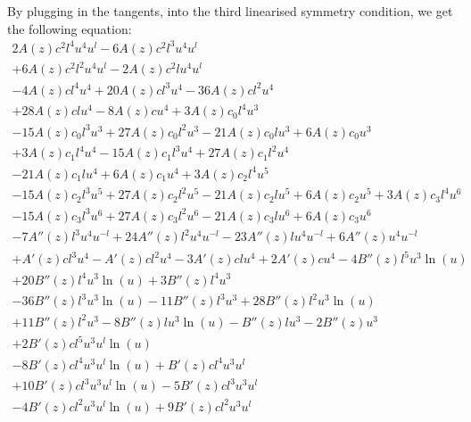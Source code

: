 By plugging in the tangents, into the third linearised symmetry condition, we get the following equation:
\begin{equation}
  \begin{split}
    2 A(z) c^{2} l^{4} u^{4} u^{l} - 6 A(z) c^{2} l^{3} u^{4} u^{l} &\\
    + 6 A(z) c^{2} l^{2} u^{4} u^{l} - 2 A(z) c^{2} l u^{4} u^{l} &\\
    - 4 A(z) c l^{4} u^{4} + 20 A(z) c l^{3} u^{4} - 36 A(z) c l^{2} u^{4}&\\
    + 28 A(z) c l u^{4} - 8 A(z) c u^{4} + 3 A(z) c_{0} l^{4} u^{3}&\\
    - 15 A(z) c_{0} l^{3} u^{3} + 27 A(z) c_{0} l^{2} u^{3} - 21 A(z) c_{0} l u^{3} + 6 A(z) c_{0} u^{3}&\\
    + 3 A(z) c_{1} l^{4} u^{4} - 15 A(z) c_{1} l^{3} u^{4} + 27 A(z) c_{1} l^{2} u^{4} &\\
    - 21 A(z) c_{1} l u^{4} + 6 A(z) c_{1} u^{4} + 3 A(z) c_{2} l^{4} u^{5} &\\
    - 15 A(z) c_{2} l^{3} u^{5} + 27 A(z) c_{2} l^{2} u^{5} - 21 A(z) c_{2} l u^{5} + 6 A(z) c_{2} u^{5} + 3 A(z) c_{3} l^{4} u^{6}&\\
    - 15 A(z) c_{3} l^{3} u^{6} + 27 A(z) c_{3} l^{2} u^{6} - 21 A(z) c_{3} l u^{6} + 6 A(z) c_{3} u^{6} &\\
    - 7 A''(z) l^{3} u^{4} u^{- l} + 24 A''(z) l^{2} u^{4} u^{- l} - 23 A''(z) l u^{4} u^{- l} + 6 A''(z) u^{4} u^{- l}&\\
    + A'(z) c l^{3} u^{4} - A'(z) c l^{2} u^{4} - 3 A'(z) c l u^{4} + 2 A'(z) c u^{4} - 4 B''(z) l^{5} u^{3} \ln{\left(u \right)}&\\
    + 20 B''(z) l^{4} u^{3} \ln{\left(u \right)} + 3 B''(z) l^{4} u^{3}&\\
    - 36 B''(z) l^{3} u^{3} \ln{\left(u \right)} - 11 B''(z) l^{3} u^{3} + 28 B''(z) l^{2} u^{3} \ln{\left(u \right)}&\\
    + 11 B''(z) l^{2} u^{3} - 8 B''(z) l u^{3} \ln{\left(u \right)} - B''(z) l u^{3} - 2 B''(z) u^{3}&\\
    + 2 B'(z) c l^{5} u^{3} u^{l} \ln{\left(u \right)}&\\
    - 8 B'(z) c l^{4} u^{3} u^{l} \ln{\left(u \right)} + B'(z) c l^{4} u^{3} u^{l}&\\
    + 10 B'(z) c l^{3} u^{3} u^{l} \ln{\left(u \right)} - 5 B'(z) c l^{3} u^{3} u^{l}&\\
    - 4 B'(z) c l^{2} u^{3} u^{l} \ln{\left(u \right)} + 9 B'(z) c l^{2} u^{3} u^{l}&\\

\end{split}
\end{equation}
